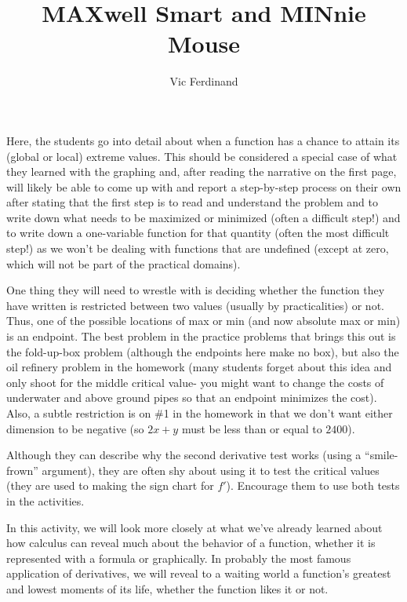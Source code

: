 \documentclass[handout]{ximera}
\author{Vic Ferdinand}
\title{MAXwell Smart and MINnie Mouse}
\begin{document}
\begin{abstract}
\end{abstract}
\maketitle

\begin{instructorIntro}
Here, the students go into detail about when a function has a chance to attain its (global or local) extreme values.  This should be considered a special case of what they learned with the graphing and, after reading the narrative on the first page, will likely be able to come up with and report a step-by-step process on their own after stating that the first step is to read and understand the problem and to write down what needs to be maximized or minimized (often a difficult step!) and to write down a one-variable function for that quantity (often the most difficult step!) as we won't be dealing with functions that are undefined (except at zero, which will not be part of the practical domains).

One thing they will need to wrestle with is deciding whether the function they have written is restricted between two values (usually by practicalities) or not.  Thus, one of the possible locations of max or min (and now absolute max or min) is an endpoint.  The best problem in the practice problems that brings this out is the fold-up-box problem (although the endpoints here make no box), but also the oil refinery problem in the homework (many students forget about this idea and only shoot for the middle critical value- you might want to change the costs of underwater and above ground pipes so that an endpoint minimizes the cost).  Also, a subtle restriction is on \#1 in the homework in that we don't want either dimension to be negative (so $2x + y$ must be less than or equal to $2400$).

Although they can describe why the second derivative test works (using a ``smile-frown'' argument), they are often shy about using it to test the critical values (they are used to making the sign chart for $f'$).  Encourage them to use both tests in the activities.

\end{instructorIntro}


In this activity, we will look more closely at what we've already learned about how calculus can reveal much about the behavior of a function, whether it is represented with a formula or graphically.  In probably the most famous application of derivatives, we will reveal to a waiting world a function's greatest and lowest moments of its life, whether the function likes it or not.
\end{document}
